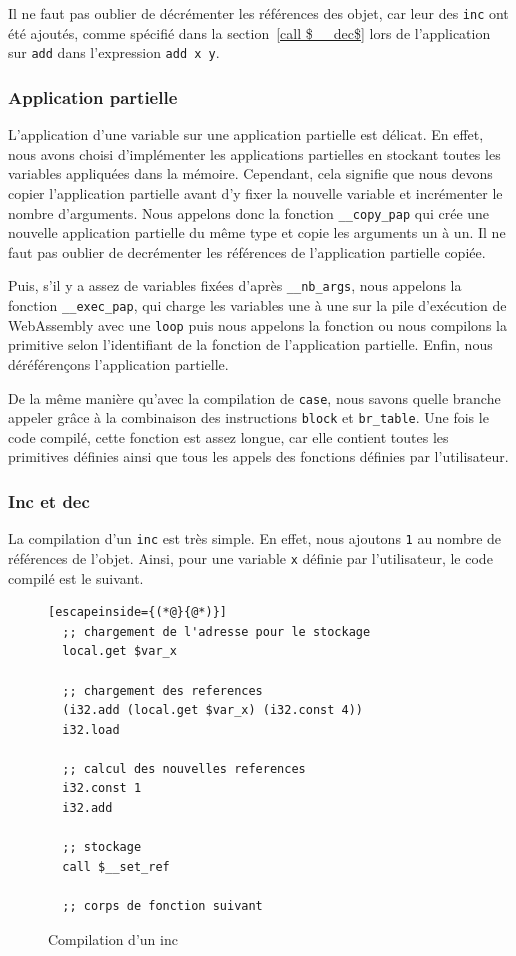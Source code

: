 \documentclass{rapportECL}
\begin{document}
Il ne faut pas oublier de décrémenter les références des objet, car leur des \verb|inc| ont été ajoutés, comme spécifié dans la 
section~\ref{call $__dec$} lors de l'application sur \verb|add| dans l'expression \verb|add x y|.

\subsubsection{Application partielle}

L'application d'une variable sur une application partielle est délicat. En effet, nous avons choisi d'implémenter les applications partielles en stockant toutes les variables appliquées dans la mémoire. Cependant, cela signifie que nous devons copier l'application partielle avant d'y fixer la nouvelle variable et incrémenter le nombre d'arguments. Nous appelons donc la fonction \verb|__copy_pap| qui crée une nouvelle application partielle du même type et copie les arguments un à un. Il ne faut pas oublier de decrémenter les références de l'application partielle copiée.

Puis, s'il y a assez de variables fixées d'après \verb|__nb_args|, nous appelons la fonction \verb|__exec_pap|, qui charge les variables une à une sur la pile d'exécution de WebAssembly avec une \verb|loop| puis nous appelons la fonction ou nous compilons la primitive selon l'identifiant de la fonction de l'application partielle. Enfin, nous déréférençons l'application partielle.

De la même manière qu'avec la compilation de \verb|case|, nous savons quelle branche appeler grâce à la combinaison des instructions \verb|block| et \verb|br_table|. Une fois le code compilé, cette fonction est assez longue, car elle contient toutes les primitives définies ainsi que tous les appels des fonctions définies par l'utilisateur.

\subsubsection{Inc et dec}

La compilation d'un \verb|inc| est très simple. En effet, nous ajoutons \verb|1| au nombre de références de l'objet. 
Ainsi, pour une variable \verb|x| définie par l'utilisateur, le code compilé est le suivant.

\begin{figure}[H]
	\begin{lstlisting}[escapeinside={(*@}{@*)}]
  ;; chargement de l'adresse pour le stockage
  local.get $var_x

  ;; chargement des references
  (i32.add (local.get $var_x) (i32.const 4))
  i32.load
   
  ;; calcul des nouvelles references
  i32.const 1
  i32.add

  ;; stockage
  call $__set_ref

  ;; corps de fonction suivant
	\end{lstlisting}
	\caption{Compilation d'un inc}
	\label{listing:compile_inc}
\end{figure}
\end{document}
